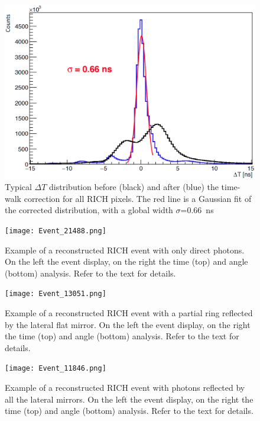 \documentclass[5p,times,twocolumn]{elsarticle}
\def\dT{$\Delta T$ }
\begin{document}
\begin{figure}[h]
\begin{center}
\includegraphics[width=1.0\columnwidth]{Calibration_allch2.png}
\end{center}
\caption{Typical \dT distribution before (black) and after (blue) the time-walk correction for all RICH pixels.
The red line is a Gaussian fit of the corrected distribution, with a global width $\sigma$=0.66~ns}
\label{Fig:ResoTime}
\end{figure}

\begin{figure}[!ht]
\begin{center}
\texttt{[image: Event\_21488.png]}
\end{center}
\caption{Example of a reconstructed RICH event with only direct photons. On the left the event display, on the right the time (top) and angle (bottom) analysis. Refer to the text for details.} 
\label{Fig:Event1}
\end{figure}

\begin{figure}[!ht]
\begin{center}
\texttt{[image: Event\_13051.png]}
\end{center}
\caption{Example of a reconstructed RICH event with a partial ring reflected by the lateral flat mirror. On the left the event display, on the right the time (top) and angle (bottom) analysis. Refer to the text for details.}
\label{Fig:Event2}
\end{figure}

\begin{figure}[!ht]
\begin{center}
\texttt{[image: Event\_11846.png]}
\end{center}
\caption{Example of a reconstructed RICH event with photons reflected by all the lateral mirrors. On the left the event display, on the right the time (top) and angle (bottom) analysis. Refer to the text for details.} 
\label{Fig:Event3}
\end{figure}
\end{document}
